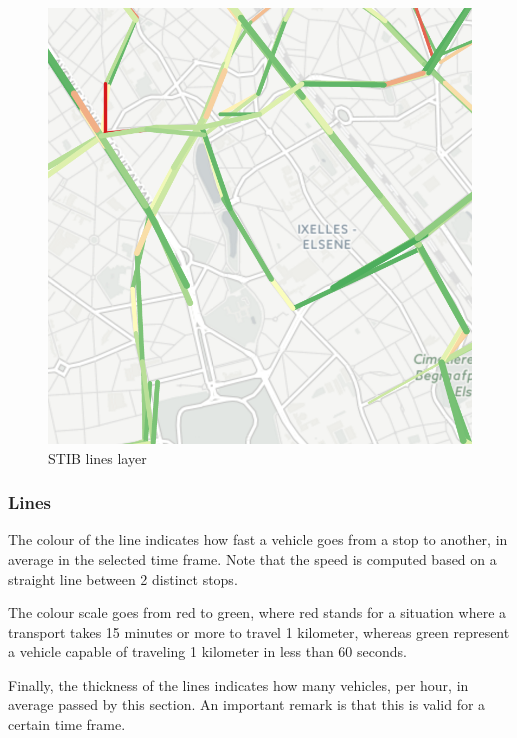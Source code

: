 \documentclass[11pt]{article}%
\begin{document}
\begin{minipage}{0.3\textwidth}
  \begin{figure}[H]
    \includegraphics[width=\textwidth]{images/lines.png}
    \caption{STIB lines layer}
  \end{figure}
\end{minipage}\hfill
\begin{minipage}{0.6\textwidth}
  \subsubsection{Lines}
  The colour of the line indicates how fast a vehicle goes from a stop to another, in average in the selected time frame. Note that the speed is computed based on a straight line between 2 distinct stops.

  The colour scale goes from red to green, where red stands for a situation where a transport takes 15 minutes or more to travel 1 kilometer, whereas green represent a vehicle capable of traveling 1 kilometer in less than 60 seconds.

  Finally, the thickness of the lines indicates how many vehicles, per hour, in average passed by this section. An important remark is that this is valid for a certain time frame.
\end{minipage}
\end{document}
